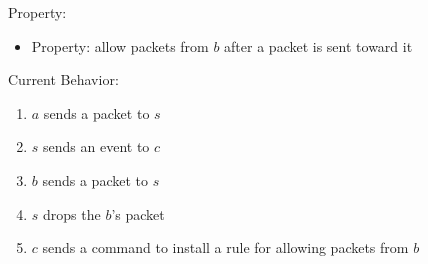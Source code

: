\begin{frame}
    \begin{center}
    \end{center}
    Property:
    \begin{itemize}
        \item Property: allow packets from $b$ after a packet is sent toward it
    \end{itemize}
    Current Behavior:
    \begin{enumerate}
        \item $a$ sends a packet to $s$
        \item $s$ sends an event to $c$
        \item $b$ sends a packet to $s$
        \item $s$ drops the $b$'s packet
        \item $c$ sends a command to install a rule for allowing packets from $b$
    \end{enumerate}
\end{frame}

